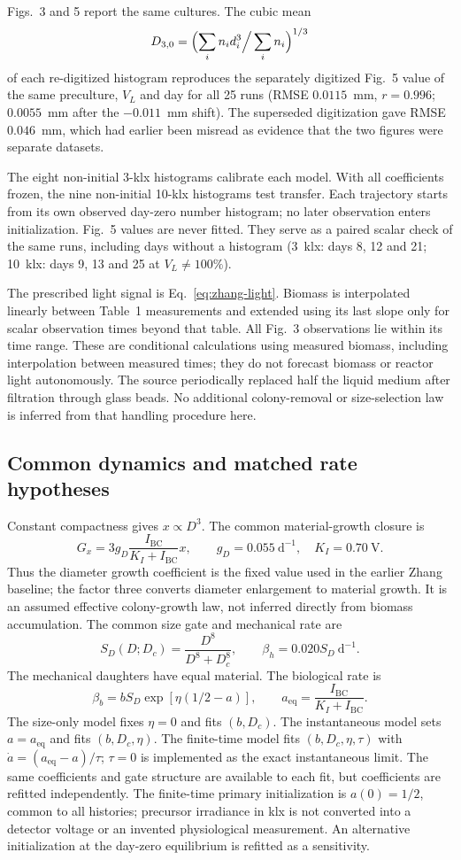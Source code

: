 Figs.~3 and 5 report the same cultures. The cubic mean
\[
 D_{3,0}=\Bigl(\sum_in_id_i^3\Big/\sum_in_i\Bigr)^{1/3}
\]
of each re-digitized histogram reproduces the separately digitized Fig.~5 value of the same preculture, $V_L$ and day for all 25 runs (RMSE $0.0115$~mm, $r=0.996$; $0.0055$~mm after the $-0.011$~mm shift). The superseded digitization gave RMSE $0.046$~mm, which had earlier been misread as evidence that the two figures were separate datasets.

The eight non-initial 3-klx histograms calibrate each model. With all coefficients frozen, the nine non-initial 10-klx histograms test transfer. Each trajectory starts from its own observed day-zero number histogram; no later observation enters initialization. Fig.~5 values are never fitted. They serve as a paired scalar check of the same runs, including days without a histogram (3~klx: days 8, 12 and 21; 10~klx: days 9, 13 and 25 at $V_L\neq100\%$).

The prescribed light signal is Eq.~\eqref{eq:zhang-light}. Biomass is interpolated linearly between Table~1 measurements and extended using its last slope only for scalar observation times beyond that table. All Fig.~3 observations lie within its time range. These are conditional calculations using measured biomass, including interpolation between measured times; they do not forecast biomass or reactor light autonomously. The source periodically replaced half the liquid medium after filtration through glass beads. No additional colony-removal or size-selection law is inferred from that handling procedure here.

\subsection{Common dynamics and matched rate hypotheses}

Constant compactness gives $x\propto D^3$. The common material-growth closure is
\[
 G_x=3g_D\frac{I_{\mathrm{BC}}}{K_I+I_{\mathrm{BC}}}x,
 \qquad g_D=0.055~\mathrm{d^{-1}},\quad K_I=0.70~\mathrm{V}.
\]
Thus the diameter growth coefficient is the fixed value used in the earlier Zhang baseline; the factor three converts diameter enlargement to material growth. It is an assumed effective colony-growth law, not inferred directly from biomass accumulation. The common size gate and mechanical rate are
\[
 S_D(D;D_c)=\frac{D^8}{D^8+D_c^8},\qquad
 \beta_h=0.020S_D~\mathrm{d^{-1}}.
\]
The mechanical daughters have equal material. The biological rate is
\[
 \beta_b=bS_D\exp[\eta(1/2-a)],\qquad
 a_{\mathrm{eq}}=\frac{I_{\mathrm{BC}}}{K_I+I_{\mathrm{BC}}}.
\]
The size-only model fixes $\eta=0$ and fits $(b,D_c)$. The instantaneous model sets $a=a_{\mathrm{eq}}$ and fits $(b,D_c,\eta)$. The finite-time model fits $(b,D_c,\eta,\tau)$ with $\dot a=(a_{\mathrm{eq}}-a)/\tau$; $\tau=0$ is implemented as the exact instantaneous limit. The same coefficients and gate structure are available to each fit, but coefficients are refitted independently. The finite-time primary initialization is $a(0)=1/2$, common to all histories; precursor irradiance in klx is not converted into a detector voltage or an invented physiological measurement. An alternative initialization at the day-zero equilibrium is refitted as a sensitivity.

